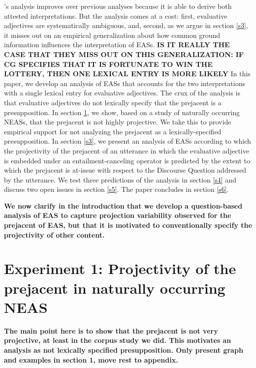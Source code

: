 \documentclass[11pt,fleqn]{article}
\newcommand{\6}{\mbox{$[\hspace*{-.6mm}[$}}
\newcommand{\9}{\mbox{$]\hspace*{-.6mm}]$}}
\newcommand{\citepos}[1]{\citeauthor{#1}'s \citeyear{#1}}
\begin{document}
\citepos{karttunen-etal2014} analysis improves over previous analyses because it is able to derive both attested interpretations. But the analysis comes at a cost: first, evaluative adjectives are systematically ambiguous, and, second, as we argue in section \ref{s3}, it misses out on an empirical generalization about how common ground information  influences the interpretation of EASs. {\bf  IS IT REALLY THE CASE THAT THEY MISS OUT ON THIS GENERALIZATION: IF CG SPECIFIES THAT IT IS FORTUNATE TO WIN THE LOTTERY, THEN ONE LEXICAL ENTRY IS MORE LIKELY} In this paper, we develop an analysis of EASs that accounts for the two interpretations with a single lexical entry for evaluative adjectives. The crux of the analysis is that evaluative adjectives do not lexically specify that the prejacent is a presupposition. In section \ref{s2}, we show, based on a study of naturally occurring NEASs, that the prejacent is not highly projective. We take this to provide empirical support for not analyzing the prejacent as a lexically-specified presupposition. In section \ref{s3}, we present an analysis of EASs according to which the projectivity of the prejacent of an utterance in which the evaluative adjective is embedded under an entailment-canceling operator is predicted by the extent to which the prejacent is at-issue with respect to the Discourse Question addressed by the utterance. We test three predictions of the analysis in section \ref{s4} and discuss two open issues in section \ref{s5}. The paper concludes in section \ref{s6}.

{\bf We now clarify in the introduction that we develop a question-based analysis of EAS to capture projection variability observed for the prejacent of EAS, but that it is motivated to conventionally specify the projectivity of other content.}

\section{Experiment 1: Projectivity of the prejacent in naturally occurring NEAS}\label{s2}

{\bf The main point here is to show that the prejacent is not very projective, at least in the corpus study we did. This motivates an analysis as not lexically specified presupposition. Only present graph and examples in section 1, move rest to appendix.}
\end{document}
